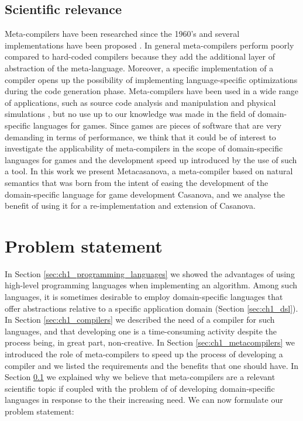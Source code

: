 \subsection{Scientific relevance} %
\label{sec:ch1_scientific_relevance}
Meta-compilers have been researched since the 1960's \cite{schorre1964meta} and several implementations have been proposed \cite{ braborovansky1998overview, venboer2008stratego, klint2009rascal, pettersson1996compiler, verdejo2006executable}. In general meta-compilers perform poorly compared to hard-coded compilers because they add the additional layer of abstraction of the meta-language. Moreover, a specific implementation of a compiler opens up the possibility of implementing language-specific optimizations during the code generation phase. Meta-compilers have been used in a wide range of applications, such as source code analysis and manipulation and physical simulations \cite{kaagedal1998generating}, but no use up to our knowledge was made in the field of domain-specific languages for games. Since games are pieces of software that are very demanding in terms of performance, we think that it could be of interest to investigate the applicability of meta-compilers in the scope of domain-specific languages for games and the development speed up introduced by the use of such a tool. In this work we present Metacasanova, a meta-compiler based on natural semantics that was born from the intent of easing the development of the domain-specific language for game development Casanova, and we analyse the benefit of using it for a re-implementation and extension of Casanova.

\section{Problem statement}
\label{sec:ch1_problem_statement}
In Section \ref{sec:ch1_programming_languages} we showed the advantages of using high-level programming languages when implementing an algorithm. Among such languages, it is sometimes desirable to employ domain-specific languages that offer abstractions relative to a specific application domain (Section \ref{sec:ch1_dsl}). In Section \ref{sec:ch1_compilers} we described the need of a compiler for such languages, and that developing one is a time-consuming activity despite the process being, in great part, non-creative. In Section \ref{sec:ch1_metacompilers} we introduced the role of meta-compilers to speed up the process of developing a compiler and we listed the requirements and the benefits that one should have. In Section \ref{sec:ch1_scientific_relevance} we explained why we believe that meta-compilers are a relevant scientific topic if coupled with the problem of of developing domain-specific languages in response to the their increasing need. We can now formulate our problem statement:

